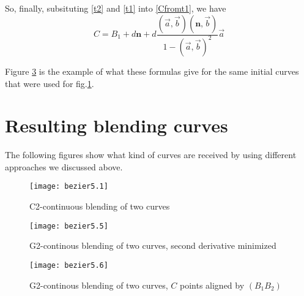 \documentclass[12pt,a4paper]{article}
\begin{document}
So, finally, subsituting \eqref{t2} and \eqref{t1} into \eqref{Cfromt1}, we have
\begin{equation}
  C = B_1 + d\mathbf{n} + d\frac{(\vec{a}, \vec{b})(\mathbf{n}, \vec{b})}{1 - (\vec{a}, \vec{b})^2}\vec{a}
\end{equation}

Figure \ref{fig:b1b2} is the example of what these formulas give for the same initial curves that were used for fig.\ref{fig:C2}.

\section{Resulting blending curves}

The following figures show what kind of curves are received by using different approaches we discussed above.

\begin{figure}[h]
  \caption{C2-continuous blending of two curves}
  \label{fig:C2}
  \texttt{[image: bezier5.1]}
  \centering
\end{figure}

\begin{figure}[ht]
  \caption{G2-continous blending of two curves, second derivative minimized}
  \label{fig:minimizedCurve}
  \texttt{[image: bezier5.5]}
  \centering
\end{figure}

\begin{figure}[ht]
  \caption{G2-continous blending of two curves, $C$ points aligned by $(B_1B_2)$}
  \label{fig:b1b2}
  \texttt{[image: bezier5.6]}
  \centering
\end{figure}
\end{document}
